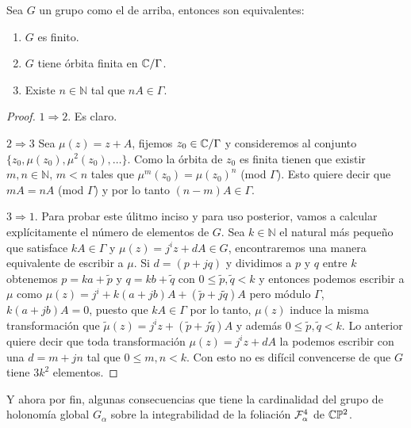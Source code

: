 \begin{Corolario}
\label{Coro:Equivalencias}
Sea $G$ un grupo como el de arriba, entonces son equivalentes:
\begin{enumerate}
\item $G$ es finito.
\item $G$ tiene órbita finita en $\mathbb{C}/\Gamma$.
\item Existe $n\in\mathbb{N}$ tal que $nA\in\Gamma$.
\end{enumerate}
\end{Corolario}
\begin{proof}
$1\Rightarrow 2$. Es claro.

\noindent $2\Rightarrow 3$ Sea $\mu(z)=z+A$, fijemos $z_{0}\in\mathbb{C}/\Gamma$ y consideremos al conjunto $\{z_{0},\mu(z_{0}),\mu^{2}(z_{0}),\ldots \}$. Como la órbita de $z_{0}$ es finita tienen que existir $m,n\in\mathbb{N},\, m<n$ tales que $\mu^{m}(z_{0})=\mu(z_{0})^{n}$ (mod $\Gamma$). Esto quiere decir que $mA=nA$ (mod $\Gamma$) y por lo tanto $(n-m)A\in\Gamma$.

\noindent $3\Rightarrow 1$. Para probar este úlitmo inciso y para uso posterior, vamos a calcular explícitamente el número de elementos de $G$. Sea $k\in\mathbb{N}$ el natural más pequeño que satisface $kA\in\Gamma$ y $\mu(z)=j^{i}z+dA\in G$, encontraremos una manera equivalente de escribir a $\mu$. Si $d=(p+jq)$ y dividimos a $p$ y $q$ entre $k$ obtenemos $p=ka +\tilde{p}$ y $q=kb+\tilde{q}$ con $0\leq\tilde{p},\tilde{q}<k$ y entonces podemos escribir a $\mu$ como $\mu(z)=j^{i}+k(a+jb)A+(\tilde{p}+j\tilde{q})A$ pero módulo $\Gamma$, $k(a+jb)A=0$, puesto que $kA\in\Gamma$ por lo tanto, $\mu(z)$ induce la misma transformación que $\tilde{\mu}(z)=j^{i}z+(\tilde{p}+j\tilde{q})A$ y además $0\leq\tilde{p},\tilde{q}<k$. Lo anterior quiere decir que toda transformación $\mu(z)=j^{i}z+dA$ la podemos escribir con una $d=m+jn$ tal que $0\leq m,n<k$. Con esto no es difícil convencerse de que $G$ tiene $3k^{2}$ elementos.
\end{proof}

Y ahora por fin, algunas consecuencias que tiene la cardinalidad del grupo de holonomía global $G_{\alpha}$ sobre la integrabilidad de la foliación $\mathcal{F}_{\alpha}^{4}$ de $\mathbb{C}\mathbb{P}^2$.

